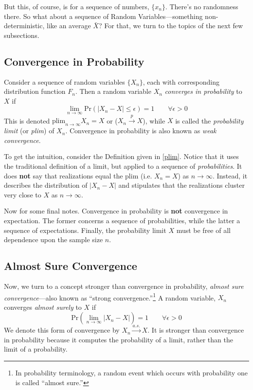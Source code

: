 \documentclass[a4paper,12pt]{scrartcl}
\begin{document}
But this, of course, is for a sequence of numbers, $\{x_n\}$.
There's no randomness there.  So what about a sequence of 
Random Variables---something non-deterministic, like an 
average $\bar{X}$? For that, 
we turn to the topics of the next few subsections.

\subsection{Convergence in Probability}

Consider a sequence of random variables $\{ X_n \}$, 
each with corresponding distribution function $F_n$.
Then a random variable $X_n$ \emph{converges in probability}
to $X$ if
\begin{equation}
    \label{plim}
    \lim_{n\rightarrow\infty} \text{Pr}\left(\left\lvert X_n
	- X \right\rvert \leq \epsilon \right) = 1
    \qquad \forall \epsilon > 0
\end{equation}
This is denoted $\text{plim}_{n\rightarrow\infty} X_n = X$ or
($X_n\overset{p}{\to}X$),
while $X$ is called the \emph{probability limit} (or \emph{plim})
of $X_n$. Convergence in probability is also known as 
\emph{weak convergence}.

To get the intuition, consider the Definition given in 
\ref{plim}. Notice that it uses the traditional definition
of a limit, but applied to a sequence of 
\emph{probabilities}.  It does \textbf{not} say that 
realizations equal the plim (i.e. $X_n = X$)
as $n\rightarrow\infty$. Instead, it describes the distribution
of $|X_n - X|$ and stipulates that the realizations
cluster very close to $X$ as $n\rightarrow\infty$.

Now for some final notes. Convergence in probability
is \textbf{not} convergence in expectation. The former
concerns a sequence of probabilities, while the latter a
sequence of expectations. Finally, the probability limit
$X$ must be free of all dependence upon the sample size $n$.

\subsection{Almost Sure Convergence}

Now, we turn to a concept stronger
than convergence in probability, \emph{almost sure
convergence}---also known as ``strong
convergence.''\footnote{In probability terminology, 
a random event which occurs
with probability one is called ``almost sure.''}
A random variable, $X_n$ converges \emph{almost surely}
to $X$ if
\begin{equation}
    \label{almsure}
    \text{Pr}\left(\lim_{n\rightarrow \infty}
	\left\lvert X_n - X \right\rvert \right) = 1
    \qquad \forall \epsilon > 0
\end{equation}
We denote this form of convergence by 
$X_n\overset{a.s.}{\to}X$. It is stronger than 
convergence in probability because it computes the probability
of a limit, rather than the limit of a probability.
\end{document}
